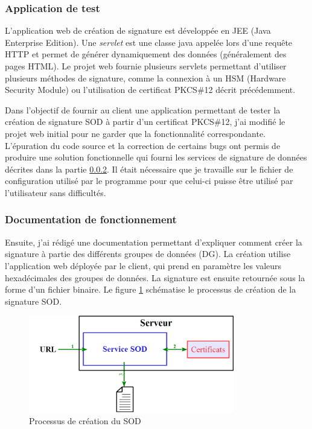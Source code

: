 
\subsubsection{Application de test}

L'application web de création de signature est développée en JEE (Java Enterprise Edition).
Une \textit{servlet} est une classe java appelée lors d'une requête HTTP et permet de générer dynamiquement des données (généralement des pages HTML).
Le projet web fournie plusieurs servlets permettant d'utiliser plusieurs méthodes de signature, comme la connexion à un HSM (Hardware Security Module) ou l'utilisation de certificat PKCS\#12 décrit précédemment.

Dans l'objectif de fournir au client une application permettant de tester la création de signature SOD à partir d'un certificat PKCS\#12, j'ai modifié le projet web initial pour ne garder que la fonctionnalité correspondante.
L'épuration du code source et la correction de certains bugs ont permis de produire une solution fonctionnelle qui fourni les services de signature de données décrites dans la partie \ref{Documentation de fonctionnement}.
Il était nécessaire que je travaille sur le fichier de configuration utilisé par le programme pour que celui-ci puisse être utilisé par l'utilisateur sans difficultés.


\subsubsection{Documentation de fonctionnement}
\label{Documentation de fonctionnement}

Ensuite, j'ai rédigé une documentation permettant d'expliquer comment créer la signature à partie des différents groupes de données (DG).
La création utilise l'application web déployée par le client, qui prend en paramètre les valeurs hexadécimales des groupes de données.
La signature est ensuite retournée sous la forme d'un fichier binaire.
Le figure \ref{processus_SOD} schématise le processus de création de la signature SOD.
\begin{figure}[!h]
	\center
	\includegraphics[width=0.8\textwidth]{img/processus_SOD.png}
	\caption{Processus de création du SOD}
	\label{processus_SOD}
\end{figure}

